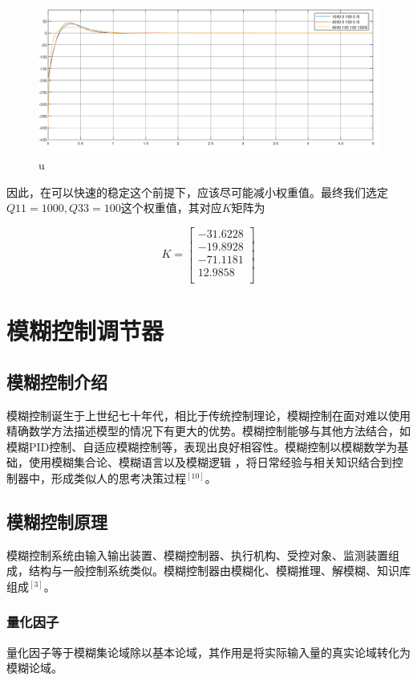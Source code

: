 \begin{figure}[hbpt]
\centering
\includegraphics[width=12cm]{u.png}
\caption{u}\label{u}
\end{figure}

因此，在可以快速的稳定这个前提下，应该尽可能减小权重值。最终我们选定$Q11=1000,Q33=100$这个权重值，其对应$K$矩阵为

\begin{equation}
K=
\begin{bmatrix}
-31.6228\\
-19.8928\\
-71.1181\\
12.9858\\
\end{bmatrix}
\end{equation}

\chapter{模糊控制调节器}

\section{模糊控制介绍}
模糊控制诞生于上世纪七十年代，相比于传统控制理论，模糊控制在面对难以使用精确数学方法描述模型的情况下有更大的优势。模糊控制能够与其他方法结合，如模糊PID控制、自适应模糊控制等，表现出良好相容性。模糊控制以模糊数学为基础，使用模糊集合论、模糊语言以及模糊逻辑 ，将日常经验与相关知识结合到控制器中，形成类似人的思考决策过程$^{[10]}$。

\section{模糊控制原理}
模糊控制系统由输入输出装置、模糊控制器、执行机构、受控对象、监测装置组成，结构与一般控制系统类似。模糊控制器由模糊化、模糊推理、解模糊、知识库组成$^{[3]}$。
\subsection{量化因子}
量化因子等于模糊集论域除以基本论域，其作用是将实际输入量的真实论域转化为模糊论域。
